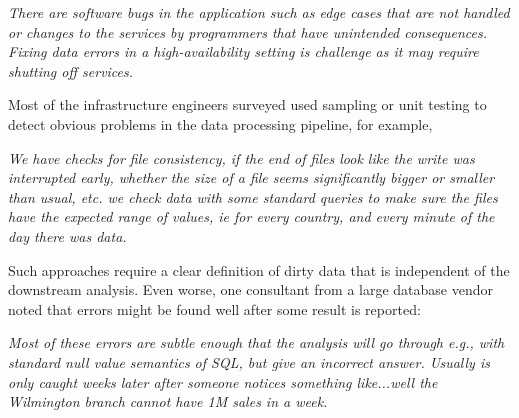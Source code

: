 \vspace{0.5em}
\emph{There are software bugs in the application such as edge cases that are not handled or changes to the services by programmers that have unintended consequences. Fixing data errors in a high-availability setting is challenge as it may require shutting off services.}

\vspace{0.5em}

Most of the infrastructure engineers surveyed used sampling or unit testing to detect obvious problems in the data processing pipeline, for example,

\vspace{0.5em}
\emph{We have checks for file consistency, if the end of files look like the write was interrupted early, whether the size of a file seems significantly bigger or smaller than usual, etc. we check data with some standard queries to make sure the files have the expected range of values, ie for every country, and every minute of the day there was data.}

\vspace{0.5em}

Such approaches require a clear definition of dirty data that is independent of the downstream analysis. Even worse, one consultant from a large database vendor noted that errors might be found well after some result is reported:

\vspace{0.5em}
\emph{Most of these errors are subtle enough that the analysis will go through e.g., with standard null value semantics of SQL, but give an incorrect answer. Usually is only caught weeks later after someone notices something like...well the Wilmington branch cannot have 1M sales in a week.}